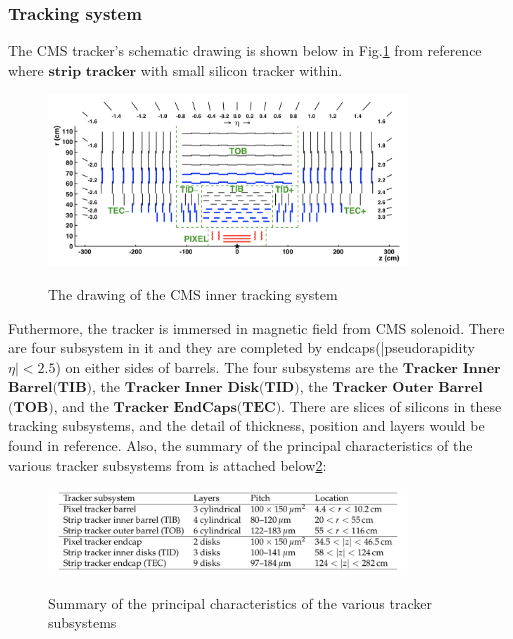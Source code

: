 		\subsubsection{Tracking system}
		\label{sssec:ExpApp_tracking}

			The CMS tracker's schematic drawing is shown below in Fig.\ref{ExpApp:fig:tracker} from reference\cite{Chatrchyan:2014fea} where $\textbf{strip tracker}$ with small silicon tracker within. 

			\begin{figure}[H]
			\centering{}
		    	\includegraphics[width=0.85\textwidth]{Figures/ExpApparatus/tracker.png}\\
			\caption{The drawing of the CMS inner tracking system\cite{Chatrchyan:2014fea}}
			\label{ExpApp:fig:tracker}
			\end{figure}
			\FloatBarrier

			Futhermore, the tracker is immersed in magnetic field from CMS solenoid. There are four subsystem in it and they are completed by endcaps(|pseudorapidity $\eta | < 2.5$) on either sides of barrels. The four subsystems are the $\textbf{Tracker}$ $\textbf{Inner}$ $\textbf{Barrel}$$\textbf{(TIB)}$, the $\textbf{Tracker}$ $\textbf{Inner}$ $\textbf{Disk}$$\textbf{(TID)}$, the $\textbf{Tracker}$ $\textbf{Outer}$ $\textbf{Barrel}$$\textbf{(TOB)}$, and the $\textbf{Tracker}$ $\textbf{EndCaps}$$\textbf{(TEC)}$. There are slices of silicons in these tracking subsystems, and the detail of thickness, position and layers would be found in reference\cite{Chatrchyan:2014fea}. Also, the summary of the principal characteristics of the various tracker subsystems from \cite{Chatrchyan:2014fea} is attached below\ref{ExpApp:fig:tracker_sum}:
			
			\begin{figure}[H]
			\centering{}
		    	\includegraphics[width=0.85\textwidth]{Figures/ExpApparatus/summary_subtracker.png}\\
			\caption{Summary of the principal characteristics of the various tracker subsystems\cite{Chatrchyan:2014fea}}
			\label{ExpApp:fig:tracker_sum}
			\end{figure}

